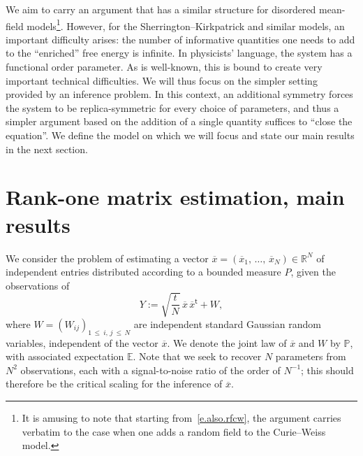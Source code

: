 \documentclass[AHL,Unicode,longabstracts,published]{cedram}
\newcommand{\R}{\mathbb{R}}
\newcommand{\E}{\mathbb{E}}
\renewcommand{\P}{\mathbb{P}}
\renewcommand{\t}{\mathsf{t}}
\newcommand{\1}{\mathds{1}}
\renewcommand{\le}{\leqslant}
\renewcommand{\bar}{\overline}
\begin{document}

We aim to carry an argument that has a similar structure for disordered mean-field models\footnote{It is amusing to note that starting from~\eqref{e.also.rfcw}, the argument carries verbatim to the case when one adds a random field to the Curie--Weiss model.}. However, for the Sherrington--Kirkpatrick and similar models, an important difficulty arises: the number of informative quantities one needs to add to the ``enriched'' free energy is infinite. In physicists' language, the system has a functional order parameter. As is well-known, this is bound to create very important technical difficulties. We will thus focus on the simpler setting provided by an inference problem. In this context, an additional symmetry forces the system to be replica-symmetric for every choice of parameters, and thus a simpler argument based on the addition of a single quantity suffices to ``close the equation''. We define the model on which we will focus and state our main results in the next section.


\section{Rank-one matrix estimation, main results}\label{s.results}

We consider the problem of estimating a vector $\bar x = (\bar x_1,\,\ldots,\,\bar x_N) \in \R^N$ of independent entries distributed according to a bounded measure $P$, given the observations of
\[
Y := \sqrt{\frac{t}{N}} \, \bar x \, \bar x^\t + W,
\]
where $W = (W_{ij})_{1\,\le\:i,\,j\:\le\,N}$ are independent standard Gaussian random variables, independent of the vector $\bar x$. We denote the joint law of $\bar x$ and $W$ by $\P$, with associated expectation $\E$. Note that we seek to recover $N$ parameters from $N^2$ observations, each with a signal-to-noise ratio of the order of $N^{-1}$; this should therefore be the critical scaling for the inference of $\bar x$.

\end{document}
